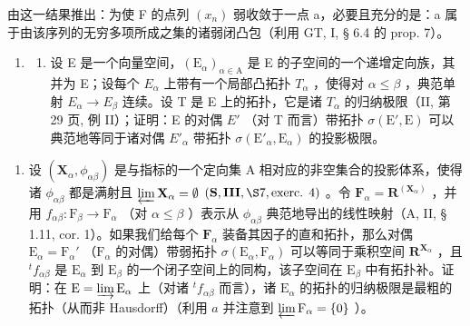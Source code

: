 由这一结果推出：为使 F 的点列 \((x_{n})\) 弱收敛于一点 a，必要且充分的是：a 属于由该序列的无穷多项所成之集的诸弱闭凸包（利用 GT, I, § 6.4 的 prop. 7）。

\begin{enumerate}
\def\labelenumi{\arabic{enumi})}
\setcounter{enumi}{11}
\tightlist
\item
  \begin{enumerate}
  \def\labelenumii{\alph{enumii})}
  \tightlist
  \item
    设 E 是一个向量空间，\((\mathrm{E}_{\alpha})_{\alpha\in\mathrm{A}}\) 是 E 的子空间的一个递增定向族，其并为 E；设每个 \(E_{\alpha}\) 上带有一个局部凸拓扑 \(T_{\alpha}\) ，使得对 \(\alpha\leqslant\beta\) ，典范单射 \(E_{\alpha}\to E_{\beta}\) 连续。设 T 是 E 上的拓扑，它是诸 \(T_{\alpha}\) 的归纳极限（II, 第 29 页, 例 II）；证明：E 的对偶 \(E'\) （对 T 而言）带拓扑 \(\sigma(\mathrm{E}',\mathrm{E})\) 可以典范地等同于诸对偶 \(E'_{\alpha}\) 带拓扑 \(\sigma(\mathrm{E}'_{\alpha},\mathrm{E}_{\alpha})\) 的投影极限。
  \end{enumerate}
\end{enumerate}

\begin{enumerate}
\def\labelenumi{\alph{enumi})}
\setcounter{enumi}{1}
\tightlist
\item
  设 \((\mathbf{X}_{\alpha},\phi_{\alpha \beta})\) 是与指标的一个定向集 A 相对应的非空集合的投影体系，使得诸 \(\phi_{\alpha \beta}\) 都是满射且 \(\varprojlim \mathbf{X}_{\alpha} = \emptyset\) \((\mathbf{S},\mathbf{III},\S 7,\text{exerc. }4)\) 。令 \(\mathbf{F}_{\alpha} = \mathbf{R}^{(\mathbf{X}_{\alpha})}\) ，并用 \(f_{\alpha \beta}:\mathrm{F}_{\beta}\to \mathrm{F}_{\alpha}\) （对 \(\alpha \leqslant \beta\) ）表示从 \(\phi_{\alpha \beta}\) 典范地导出的线性映射（A, II, § 1.11, cor. 1）。如果我们给每个 \(\mathbf{F}_{\alpha}\) 装备其因子的直和拓扑，那么对偶 \(\mathrm{E}_{\alpha} = \mathrm{F}_{\alpha}'\) （\(\mathrm{F}_{\alpha}\) 的对偶）带弱拓扑 \(\sigma(\mathrm{E}_{\alpha}, \mathrm{F}_{\alpha})\) 可以等同于乘积空间 \(\mathbf{R}^{\mathbf{X}_{\alpha}}\) ，且 \({}^{t}f_{\alpha\beta}\) 是 \(\mathrm{E}_{\alpha}\) 到 \(\mathrm{E}_{\beta}\) 的一个闭子空间上的同构，该子空间在 \(\mathrm{E}_{\beta}\) 中有拓扑补。证明：在 \(\mathrm{E} = \varinjlim \mathrm{E}_{\alpha}\) 上（对诸 \({}^{t}f_{\alpha\beta}\) 而言），诸 \(\mathrm{E}_{\alpha}\) 的拓扑的归纳极限是最粗的拓扑（从而非 Hausdorff）（利用 \(a\) 并注意到 \(\varprojlim \mathrm{F}_{\alpha} = \{0\}\) ）。
\end{enumerate}

